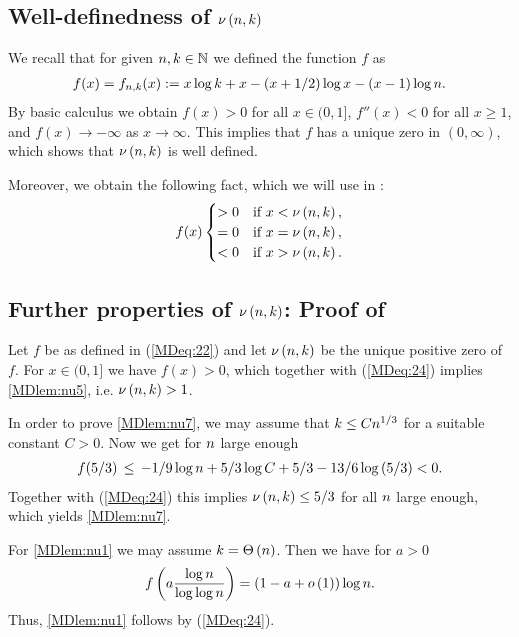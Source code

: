 \subsection[Well-definedness]{Well-definedness of $\nu\left(n, k\right)$}\label{MDsub:well_definedness}
We recall that for given $n,k\in \mathbb{N}$ we defined the function $f$ as
\begin{align}\label{MDeq:22}
	f(x)=f_{n,k}(x):=x\log k+x-\left(x+1/2\right)\log x-(x-1)\log n. 
\end{align}
By basic calculus we obtain $f(x)>0$ for all $x\in (0,1]$, $f''(x)<0$ for all $x\geq 1$, and $f(x)\to -\infty$ as $x\to \infty$. This implies that $f$ has a unique zero in $(0, \infty)$, which shows that $\nu\left(n, k\right)$ is well defined. 

Moreover, we obtain the following fact, which we will use in :
\begin{align}\label{MDeq:24}
	f(x)
	\begin{cases}
		>0 &\text{if } x<\nu\left(n, k\right),\\
		=0 &\text{if } x=\nu\left(n, k\right),\\
		<0 &\text{if } x>\nu\left(n, k\right).
	\end{cases}
\end{align}
\subsection[Further properties]{Further properties of $\nu\left(n, k\right)$: Proof of }\label{MDsub:proof_nu}
Let $f$ be as defined in (\ref{MDeq:22}) and let $\nu\left(n, k\right)$ be the unique positive zero of $f$. For $x\in(0,1]$ we have $f(x)>0$, which together with (\ref{MDeq:24}) implies \ref{MDlem:nu5}, i.e. $\nu\left(n, k\right)>1$. 

In order to prove \ref{MDlem:nu7}, we may assume that $k\leq Cn^{1/3}$ for a suitable constant $C>0$. Now we get for $n$ large enough
\begin{align*}
	f(5/3)\hspace{0.06cm}\leq\hspace{0.06cm} -1/9\log n+5/3\log C+5/3-13/6\log\left(5/3\right)<0.
\end{align*}
Together with (\ref{MDeq:24}) this implies $\nu\left(n, k\right)\leq 5/3$ for all $n$ large enough, which yields \ref{MDlem:nu7}.

For \ref{MDlem:nu1} we may assume $k=\Theta\left(n\right)$. Then we have for $a>0$
\begin{align*}
	f\left(a\frac{\log n}{\log \log n}\right)=\left(1-a+o\left(1\right)\right)\log n.
\end{align*}
Thus, \ref{MDlem:nu1} follows by (\ref{MDeq:24}). 

